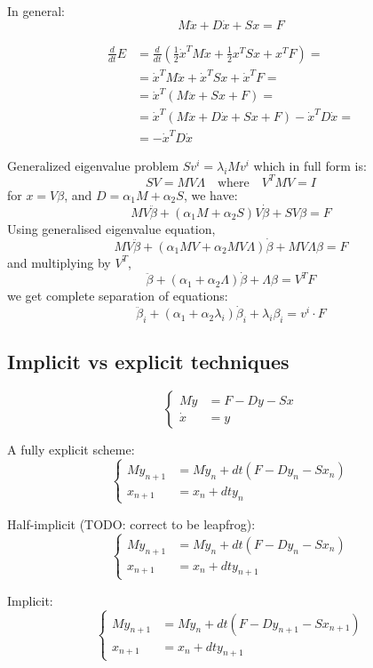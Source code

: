 \documentclass[12pt]{article}
\begin{document}
In general:
\[M\ddot x + D\dot x + Sx = F\]

\begin{align*}
\frac{d}{dt} E
&= \frac{d}{dt}\left(\frac12\dot x^TM\dot x + \frac12 x^TSx + x^TF\right) =\\
&= \dot x^TM\ddot x + \dot x^TS x + \dot x^TF =\\
&= \dot x^T\left(M\ddot x + S x + F\right) =\\
&= \dot x^T\left(M\ddot x + D\dot x + S x + F\right) - \dot x^TD\dot x =\\
&= - \dot x^TD\dot x
\end{align*}

Generalized eigenvalue problem $Sv^i = \lambda_i Mv^i$ which in full form is:
\[SV = MV\Lambda\quad\text{where}\quad V^TMV=I\]
for $x = V\beta$, and $D=\alpha_1M+\alpha_2S$, we have:
\[MV\ddot\beta + (\alpha_1M+\alpha_2S)V\dot\beta + SV\beta = F\]
Using generalised eigenvalue equation,
\[MV\ddot\beta + (\alpha_1MV+\alpha_2MV\Lambda)\dot\beta + MV\Lambda\beta = F\]
and multiplying by $V^T$,
\[\ddot\beta + (\alpha_1+\alpha_2\Lambda)\dot\beta + \Lambda\beta = V^TF\]
we get complete separation of equations:
\[\ddot\beta_i + (\alpha_1+\alpha_2\lambda_i)\dot\beta_i + \lambda_i\beta_i = v^i\cdot F\]


\subsection{Implicit vs explicit techniques}
\[\begin{cases}
M\dot y &= F - Dy - Sx\\
\dot x &= y
\end{cases}\]

A fully explicit scheme:
\[\begin{cases}
M y_{n+1} &= M\dot y_n + dt(F - Dy_n - Sx_n)\\
x_{n+1} &= x_n + dt y_n
\end{cases}\]


Half-implicit (TODO: correct to be leapfrog):
\[\begin{cases}
M y_{n+1} &= M\dot y_n + dt(F - Dy_n - Sx_n)\\
x_{n+1} &= x_n + dt y_{n+1}
\end{cases}\]

Implicit:
\[\begin{cases}
M y_{n+1} &= M\dot y_n + dt(F - Dy_{n+1} - Sx_{n+1})\\
x_{n+1} &= x_n + dt y_{n+1}
\end{cases}\]
\end{document}
